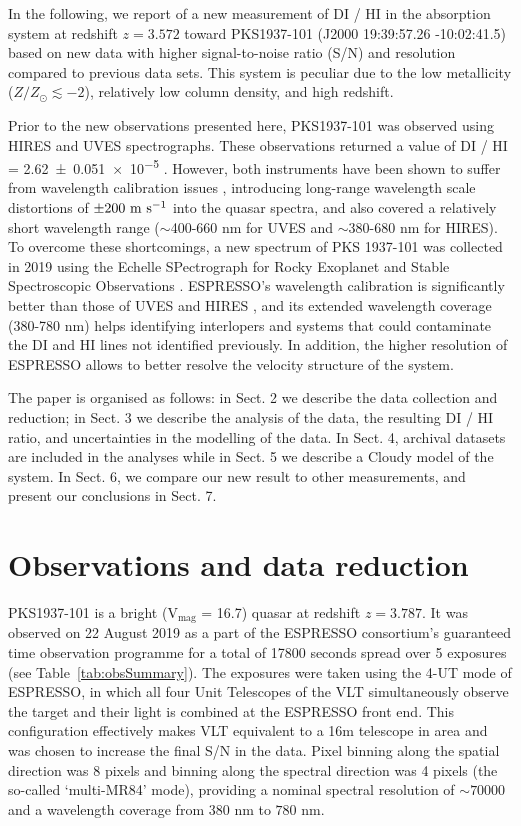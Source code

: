 \documentclass[fleqn,usenatbib]{mnras}
\makeatletter
\DeclareRobustCommand{\ion}[2]{%
  \mbox{#1\check@mathfonts\fontsize\sf@size\z@\selectfont #2}%
}
\makeatother
\begin{document}
In the following, we report of a new measurement of \ion{D}{I}/\ion{H}{I} in the absorption system at redshift $z = 3.572$ toward PKS1937-101 (J2000 19:39:57.26 -10:02:41.5) based on new data with higher signal-to-noise ratio (S/N) and resolution compared to previous data sets. This system is peculiar due to the low metallicity ($Z/Z_\odot\lesssim-2$), relatively low column density, and high redshift. 

Prior to the new observations presented here, PKS1937-101 was observed using HIRES \citep[][]{HIRES} and UVES \citep[][]{UVES} spectrographs. These observations returned a value of \ion{D}{I}/\ion{H}{I} = \num{2.62 \pm 0.051e-5}  \citep{RS_17}. However, both instruments have been shown to suffer from wavelength calibration issues \citep[][]{spectrographs_wave_distortions}, introducing long-range wavelength scale distortions of $\pm 200\ {\rm m\ s^{-1}}$ into the quasar spectra, and also covered a relatively short wavelength range ($\sim$400-660 nm for UVES and $\sim$380-680 nm for HIRES). To overcome these shortcomings, a new spectrum of PKS 1937-101 was collected in 2019 using the Echelle SPectrograph for Rocky Exoplanet and Stable Spectroscopic Observations \citep[ESPRESSO,][]{ESPRESSO}. ESPRESSO's wavelength calibration is significantly better than those of UVES and HIRES \citep{Schmidt_2021}, and its extended wavelength coverage (380-780 nm) helps identifying interlopers and systems that could contaminate the \ion{D}{I} and \ion{H}{I} lines not identified previously. In addition, the higher resolution of ESPRESSO allows to better resolve the velocity structure of the system.

The paper is organised as follows: in Sect. 2 we describe the data collection and reduction; in Sect. 3 we describe the analysis of the data, the resulting \ion{D}{I}/\ion{H}{I} ratio, and uncertainties in the modelling of the data. In Sect. 4, archival datasets are included in the analyses while in Sect. 5 we describe a Cloudy model of the system. In Sect. 6, we compare our new result to other measurements, and present our conclusions in Sect. 7.

\section{Observations and data reduction}
PKS1937-101 is a bright (V$_\mathrm{mag}$ = 16.7) quasar at redshift $z=3.787$. It was observed on 22 August 2019 as a part of the ESPRESSO consortium's guaranteed time observation programme for a total of 17800 seconds spread over 5 exposures (see Table~\ref{tab:obsSummary}). The exposures were taken using the 4-UT mode of ESPRESSO, in which all four Unit Telescopes of the VLT simultaneously observe the target and their light is combined at the ESPRESSO front end. This configuration effectively makes VLT equivalent to a 16m telescope in area and was chosen to increase the final S/N in the data. Pixel binning along the spatial direction was 8 pixels and binning along the spectral direction was 4 pixels (the so-called `multi-MR84' mode), providing a nominal spectral resolution of $\sim70000$ and a wavelength coverage from $380$ nm to $780$ nm.
\end{document}
